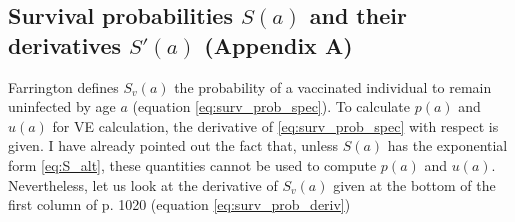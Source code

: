 \documentclass{article}[11pt]
\begin{document}
\subsection*{Survival probabilities $S(a)$ and their derivatives $S'(a)$ (Appendix A)}
%
Farrington defines $S_v(a)$ the probability of a vaccinated individual to remain uninfected by age $a$ (equation \eqref{eq:surv_prob_spec}). To calculate $p(a)$ and $u(a)$ for VE calculation, the derivative of \eqref{eq:surv_prob_spec} with respect is given. I have already pointed out the fact that, unless $S(a)$ has the exponential form \eqref{eq:S_alt}, these quantities cannot be used to compute $p(a)$ and $u(a)$. Nevertheless, let us look at the derivative of $S_v(a)$ given at the bottom of the first column of p. 1020 (equation \eqref{eq:surv_prob_deriv})

\printbibliography
%
%
%
\end{document}
